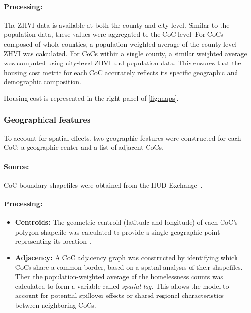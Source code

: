 \documentclass[12pt]{scrartcl}
\begin{document}
\paragraph{Processing:} The ZHVI data is available at both the county and city level. Similar to the population data, these values were aggregated to the CoC level. For CoCs composed of whole counties, a population-weighted average of the county-level ZHVI was calculated. For CoCs within a single county, a similar weighted average was computed using city-level ZHVI and population data. This ensures that the housing cost metric for each CoC accurately reflects its specific geographic and demographic composition.

Housing cost is represented in the right panel of \autoref{fig:maps}.

\subsubsection{Geographical features}
To account for spatial effects, two geographic features were constructed for each CoC: a geographic center and a list of adjacent CoCs.

\paragraph{Source:} CoC boundary shapefiles were obtained from the HUD Exchange~\cite{hudexchange2024gis}.

\paragraph{Processing:}
\begin{itemize}
    \item \textbf{Centroids:} The geometric centroid (latitude and longitude) of each CoC's polygon shapefile was calculated to provide a single geographic point representing its location~\cite{mygeodesycentroid}.
    \item \textbf{Adjacency:} A CoC adjacency graph was constructed by identifying which CoCs share a common border, based on a spatial analysis of their shapefiles. Then the population-weighted average of the homelessness counts was calculated to form a variable called \emph{spatial lag}. This allows the model to account for potential spillover effects or shared regional characteristics between neighboring CoCs.
\end{itemize}

\end{document}
